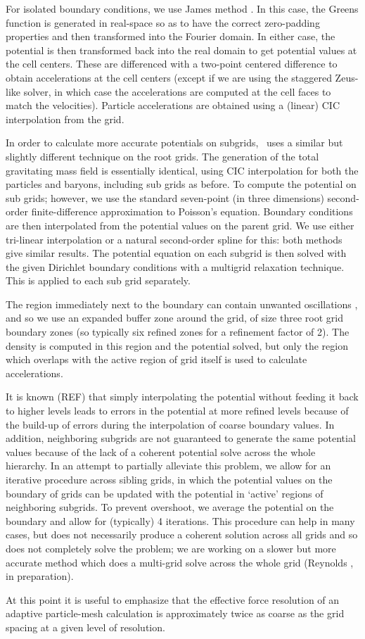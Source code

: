 For isolated boundary conditions, we use James method \citep{James77}.  In this case, the Greens function is generated in real-space so as to have the correct zero-padding properties and then transformed into the Fourier domain.  In either case, the potential is then transformed back into the real domain to get potential values at the cell centers.  These are differenced with a two-point centered difference to obtain accelerations at the cell centers (except if we are using the staggered Zeus-like solver, in which case the accelerations are computed at the cell faces to match the velocities).  Particle accelerations are obtained using a (linear) CIC interpolation from the grid.

In order to calculate more accurate potentials on subgrids, \enzo\ uses a similar but slightly different technique on the root grids.  The generation of the total gravitating mass field is essentially identical, using CIC interpolation for both the particles and baryons, including sub grids as before.  To compute the potential on sub grids; however, we use the standard seven-point (in three dimensions) second-order finite-difference approximation to Poisson's equation.  Boundary conditions are then interpolated from the potential values on the parent grid.  We use either tri-linear interpolation or a natural second-order spline for this: both methods give similar results. The potential equation on each subgrid is then solved with the given Dirichlet boundary conditions with a multigrid relaxation technique.  This is applied to each sub grid separately.

The region immediately next to the boundary can contain unwanted oscillations \citep[e.g.,][]{Anninos94}, and so we use an expanded buffer zone around the grid, of size three root grid boundary zones (so typically six refined zones for a refinement factor of 2).  The density is computed in this region and the potential solved, but only the region which overlaps with the active region of grid itself is used to calculate accelerations.

It is known (REF) that simply interpolating the potential without feeding it back to higher levels leads to errors in the potential at more refined levels because of the build-up of errors during the interpolation of coarse boundary values.  In addition, neighboring subgrids are not guaranteed to generate the same potential values because of the lack of a coherent potential solve across the whole hierarchy. In an attempt to partially alleviate this problem, we allow for an iterative procedure across sibling grids, in which the potential values on the boundary of grids can be updated with the potential in `active' regions of neighboring subgrids.  To prevent overshoot, we average the potential on the boundary and allow for (typically) 4 iterations.  This procedure can help in many cases, but does not necessarily produce a coherent solution across all grids and so does not completely solve the problem; we are working on a slower but more accurate method which does a multi-grid solve across the whole grid (Reynolds \etal, in preparation).

At this point it is useful to emphasize that the effective force resolution of an adaptive particle-mesh calculation is approximately twice as coarse as the grid spacing at a given level of resolution.


